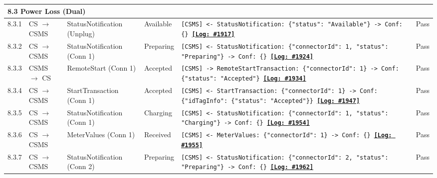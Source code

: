 \documentclass[10pt, a4paper, landscape]{article}
\begin{document}
\begin{longtable}{|p{1.0cm}|p{2.5cm}|p{4.0cm}|p{5.0cm}|p{10.0cm}|c|}
\hline
\multicolumn{6}{|l|}{\textbf{8.3 Power Loss (Dual)}} \\
\hline
8.3.1 & CS $\to$ CSMS & StatusNotification (Unplug) & Available & \footnotesize\texttt{[CSMS] <- StatusNotification: \{"status": "Available"\} \newline [CSMS] -> Conf: \{\} \newline \hyperref[log:8.3.1]{\textbf{[Log: \#1917]}}} & Pass \\
\hline
8.3.2 & CS $\to$ CSMS & StatusNotification (Conn 1) & Preparing & \footnotesize\texttt{[CSMS] <- StatusNotification: \{"connectorId": 1, "status": "Preparing"\} \newline [CSMS] -> Conf: \{\} \newline \hyperref[log:8.3.2]{\textbf{[Log: \#1924]}}} & Pass \\
\hline
8.3.3 & CSMS $\to$ CS & RemoteStart (Conn 1) & Accepted & \footnotesize\texttt{[CSMS] -> RemoteStartTransaction: \{"connectorId": 1\} \newline [CS] -> Conf: \{"status": "Accepted"\} \newline \hyperref[log:8.3.3]{\textbf{[Log: \#1934]}}} & Pass \\
\hline
8.3.4 & CS $\to$ CSMS & StartTransaction (Conn 1) & Accepted & \footnotesize\texttt{[CSMS] <- StartTransaction: \{"connectorId": 1\} \newline [CSMS] -> Conf: \{"idTagInfo": \{"status": "Accepted"\}\} \newline \hyperref[log:8.3.4]{\textbf{[Log: \#1947]}}} & Pass \\
\hline
8.3.5 & CS $\to$ CSMS & StatusNotification (Conn 1) & Charging & \footnotesize\texttt{[CSMS] <- StatusNotification: \{"connectorId": 1, "status": "Charging"\} \newline [CSMS] -> Conf: \{\} \newline \hyperref[log:8.3.5]{\textbf{[Log: \#1954]}}} & Pass \\
\hline
8.3.6 & CS $\to$ CSMS & MeterValues (Conn 1) & Received & \footnotesize\texttt{[CSMS] <- MeterValues: \{"connectorId": 1\} \newline [CSMS] -> Conf: \{\} \newline \hyperref[log:8.3.6]{\textbf{[Log: \#1955]}}} & Pass \\
\hline
8.3.7 & CS $\to$ CSMS & StatusNotification (Conn 2) & Preparing & \footnotesize\texttt{[CSMS] <- StatusNotification: \{"connectorId": 2, "status": "Preparing"\} \newline [CSMS] -> Conf: \{\} \newline \hyperref[log:8.3.7]{\textbf{[Log: \#1962]}}} & Pass \\

\end{longtable}
\end{document}
